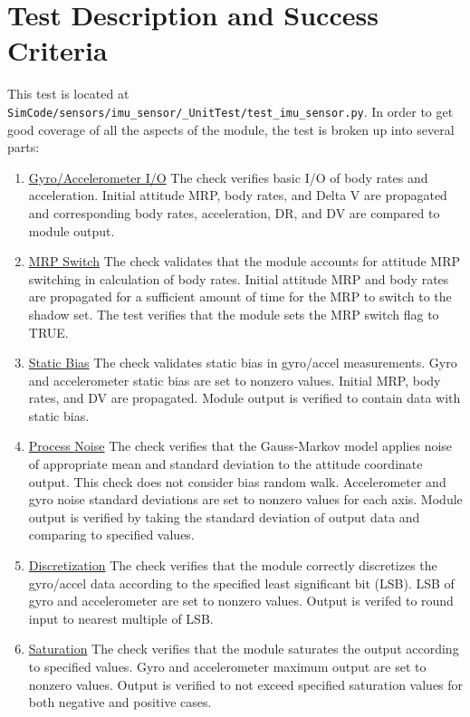 \section{Test Description and Success Criteria}
This test is located at {\tt SimCode/sensors/imu\_sensor/\_UnitTest/test\_imu\_sensor.py}. In order to get good coverage of all the aspects of the module, the test is broken up into several parts: \par

\begin{enumerate}
	\item \underline{Gyro/Accelerometer I/O} The check verifies basic I/O of body rates and acceleration. Initial attitude MRP, body rates, and Delta V are propagated and corresponding body rates, acceleration, DR, and DV are compared to module output.
	\item \underline{MRP Switch} The check validates that the module accounts for attitude MRP switching in calculation of body rates. Initial attitude MRP and body rates are propagated for a sufficient amount of time for the MRP to switch to the shadow set. The test verifies that the module sets the MRP switch flag to TRUE.
	\item \underline{Static Bias} The check validates static bias in gyro/accel measurements. Gyro and accelerometer static bias are set to nonzero values. Initial MRP, body rates, and DV are propagated. Module output is verified to contain data with static bias.
	\item \underline{Process Noise} The check verifies that the Gauss-Markov model applies noise of appropriate mean and standard deviation to the attitude coordinate output. This check does not consider bias random walk. Accelerometer and gyro noise standard deviations are set to nonzero values for each axis. Module output is verified by taking the standard deviation of output data and comparing to specified values.
	\item \underline{Discretization} The check verifies that the module correctly discretizes the gyro/accel data according to the specified least significant bit (LSB). LSB of gyro and accelerometer are set to nonzero values. Output is verifed to round input to nearest multiple of LSB.
	\item \underline{Saturation} The check verifies that the module saturates the output according to specified values. Gyro and accelerometer maximum output are set to nonzero values. Output is verified to not exceed specified saturation values for both negative and positive cases.

\end{enumerate}
